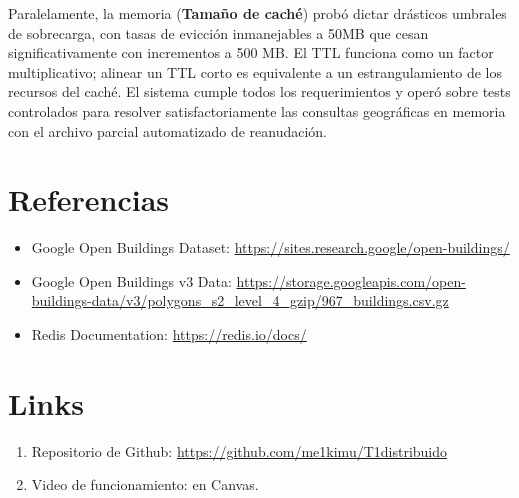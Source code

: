 \documentclass[letter,12pt]{article}
\begin{document}
Paralelamente, la memoria (\textbf{Tamaño de caché}) probó dictar drásticos umbrales de sobrecarga, con tasas de evicción inmanejables a 50MB que cesan significativamente con incrementos a 500 MB. El TTL funciona como un factor multiplicativo; alinear un TTL corto es equivalente a un estrangulamiento de los recursos del caché.
El sistema cumple todos los requerimientos y operó sobre tests controlados para resolver satisfactoriamente las consultas geográficas en memoria con el archivo parcial automatizado de reanudación.

\section{Referencias}
\begin{itemize}
  \item Google Open Buildings Dataset: \url{https://sites.research.google/open-buildings/}
  \item Google Open Buildings v3 Data: \url{https://storage.googleapis.com/open-buildings-data/v3/polygons_s2_level_4_gzip/967_buildings.csv.gz}
  \item Redis Documentation: \url{https://redis.io/docs/}
\end{itemize}

\section*{Links}
\begin{enumerate}
    \item
        Repositorio de Github:
        \url{https://github.com/me1kimu/T1distribuido}
    \item
        Video de funcionamiento: en Canvas.
\end{enumerate}
\end{document}
